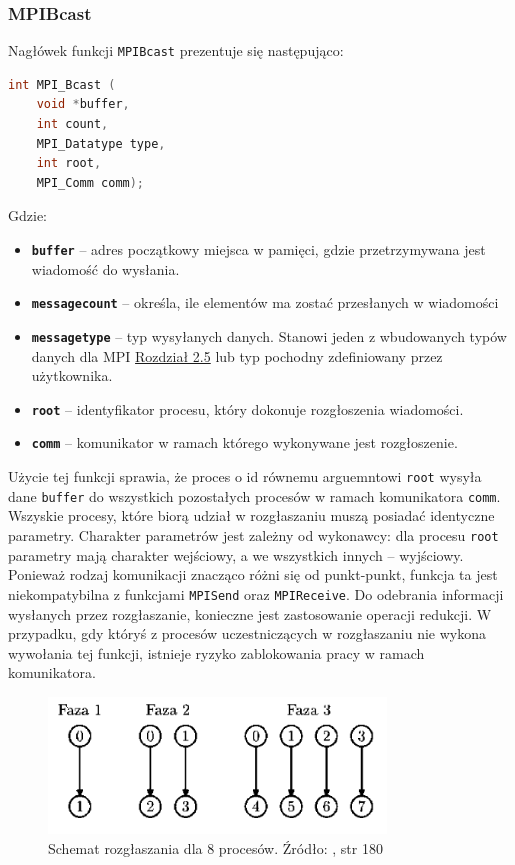 \subsubsection{MPI\textunderscore Bcast}

Nagłówek funkcji \texttt{MPI\textunderscore Bcast} prezentuje się następująco:

\begin{lstlisting}[language=C]
int MPI_Bcast (
	void *buffer,
	int count,
	MPI_Datatype type,
	int root,
	MPI_Comm comm);
\end{lstlisting}

Gdzie:
\begin{itemize}
	\item \texttt{\textbf{buffer}} -- adres początkowy miejsca w pamięci, gdzie przetrzymywana jest wiadomość do wysłania.
	\item \texttt{\textbf{message\textunderscore count}} -- określa, ile elementów ma zostać przesłanych w wiadomości
	\item \texttt{\textbf{message\textunderscore type}} -- typ wysyłanych danych. Stanowi jeden z wbudowanych typów danych dla MPI \hyperref[table:datatypes]{Rozdział 2.5} lub typ pochodny zdefiniowany przez użytkownika.
	\item \texttt{\textbf{root}} -- identyfikator procesu, który dokonuje rozgłoszenia wiadomości.
	\item \texttt{\textbf{comm}} -- komunikator w ramach którego wykonywane jest rozgłoszenie.
\end{itemize}

Użycie tej funkcji sprawia, że proces o id równemu arguemntowi \texttt{root} wysyła dane \texttt{buffer} do wszystkich pozostałych procesów w ramach komunikatora \texttt{comm}. Wszyskie procesy, które biorą udział w rozgłaszaniu muszą posiadać identyczne  parametry. Charakter parametrów jest zależny od wykonawcy: dla procesu \texttt{root} parametry mają charakter wejściowy, a we wszystkich innych -- wyjściowy. Ponieważ rodzaj komunikacji znacząco różni się od punkt-punkt, funkcja ta jest niekompatybilna z funkcjami \texttt{MPI\textunderscore Send} oraz \texttt{MPI\textunderscore Receive}. Do odebrania informacji wysłanych przez rozgłaszanie, konieczne jest zastosowanie operacji redukcji. W przypadku, gdy któryś z procesów uczestniczących w rozgłaszaniu nie wykona wywołania tej funkcji, istnieje ryzyko zablokowania pracy w ramach komunikatora.

\begin{figure}[!h]
	\centering
	\includegraphics[width=0.8\textwidth]{./img/bcast.png}
	\caption{Schemat rozgłaszania dla 8 procesów. Źródło: \cite{Czech}, str 180}
	\label{img:sieć}
\end{figure}

